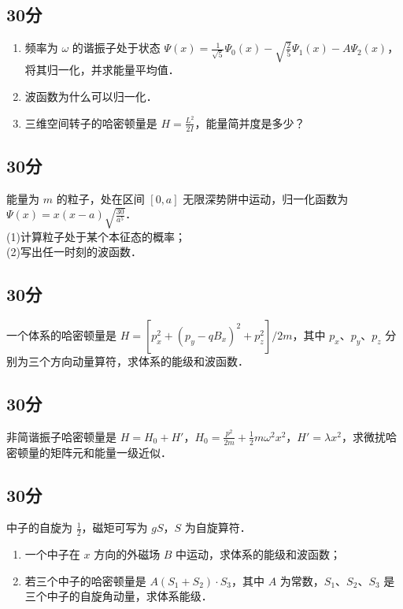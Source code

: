 
\subsection{30分}
\begin{enumerate}
\item 频率为 $\omega$ 的谐振子处于状态 $\varPsi (x)=\frac{1}{\sqrt{5}}\varPsi_{0} (x)-\sqrt{\frac{2}{5}}\varPsi_{1} (x)-A\varPsi_2 (x)$，将其归一化，并求能量平均值．
\item 波函数为什么可以归一化．
\item 三维空间转子的哈密顿量是 $H=\frac{L^{2}}{2I}$，能量简并度是多少？
\end{enumerate}
\subsection{30分}
能量为 $m$ 的粒子，处在区间 $[0,a]$ 无限深势阱中运动，归一化函数为 $\varPsi (x)=x(x-a)\sqrt{\frac{30}{a^{5}}}$．\\
(1)计算粒子处于某个本征态的概率；\\
(2)写出任一时刻的波函数．
\subsection{30分}
一个体系的哈密顿量是 $H=[p^{2}_{x}+(p_{y}-qB_{x})^{2}+p^{2}_{z}]/2m$，其中 $p_{x}$、$p_{y}$、$p_{z}$ 分别为三个方向动量算符，求体系的能级和波函数．
\subsection{30分}
非简谐振子哈密顿量是 $H=H_{0}+H'$，$H_{0}=\frac{p^{2}}{2m}+\frac{1}{2}m\omega^{2}x^{2}$，$H'=\lambda x^{2}$，求微扰哈密顿量的矩阵元和能量一级近似．
\subsection{30分}
中子的自旋为 $\frac{1}{2}$，磁矩可写为 $gS$，$S$ 为自旋算符．
\begin{enumerate}
\item 一个中子在 $x$ 方向的外磁场 $B$ 中运动，求体系的能级和波函数；
\item 若三个中子的哈密顿量是 $A(S_{1}+S_{2})\cdot S_{3}$，其中 $A$ 为常数，$S_{1}$、$S_{2}$、$S_{3}$ 是三个中子的自旋角动量，求体系能级．
\end{enumerate}